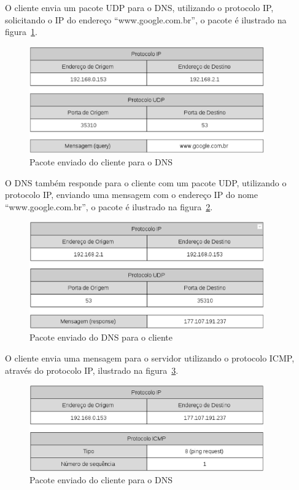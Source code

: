 O cliente envia um pacote UDP para o DNS, utilizando o protocolo
IP, solicitando o IP do endereço “www.google.com.br”, o pacote é ilustrado
na figura~\ref{fig:pkg_client_to_dns}.

    \begin{figure}[h]
      \centering
      \includegraphics[width=0.9\textwidth]{figuras/pkg_client_to_dns.eps}
      \caption{Pacote enviado do cliente para o DNS}
      \label{fig:pkg_client_to_dns}
    \end{figure}

O DNS também responde para o cliente com um pacote UDP, utilizando
o protocolo IP, enviando uma mensagem com o endereço IP do nome
“www.google.com.br”, o pacote é ilustrado na figura~\ref{fig:pkg_dns_to_client}.

    \begin{figure}[h]
      \centering
      \includegraphics[width=0.9\textwidth]{figuras/pkg_dns_to_client.eps}
      \caption{Pacote enviado do DNS para o cliente}
      \label{fig:pkg_dns_to_client}
    \end{figure}

O cliente envia uma mensagem para o servidor utilizando o protocolo ICMP,
através do protocolo IP, ilustrado na figura~\ref{fig:pkg_client_to_server}.

    \begin{figure}[h]
      \centering
      \includegraphics[width=0.9\textwidth]{figuras/pkg_client_to_server.eps}
      \caption{Pacote enviado do cliente para o DNS}
      \label{fig:pkg_client_to_server}
    \end{figure}

